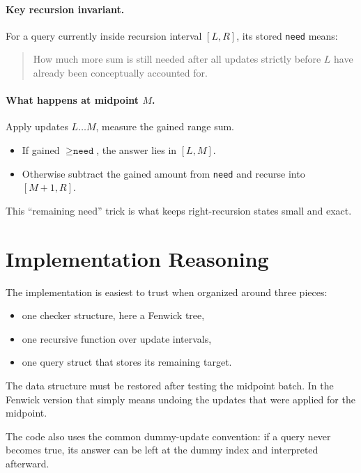 \paragraph{Key recursion invariant.}
For a query currently inside recursion interval \([L,R]\), its stored \texttt{need} means:

\begin{quote}
How much more sum is still needed after all updates strictly before \(L\) have already been conceptually accounted for.
\end{quote}

\paragraph{What happens at midpoint \(M\).}
Apply updates \(L \dots M\), measure the gained range sum.

\begin{itemize}
  \item If gained \(\ge \texttt{need}\), the answer lies in \([L,M]\).
  \item Otherwise subtract the gained amount from \texttt{need} and recurse into \([M+1,R]\).
\end{itemize}

This ``remaining need'' trick is what keeps right-recursion states small and exact.

\section*{Implementation Reasoning}

The implementation is easiest to trust when organized around three pieces:

\begin{itemize}
  \item one checker structure, here a Fenwick tree,
  \item one recursive function over update intervals,
  \item one query struct that stores its remaining target.
\end{itemize}

The data structure must be restored after testing the midpoint batch. In the Fenwick version that simply means undoing
the updates that were applied for the midpoint.

The code also uses the common dummy-update convention: if a query never becomes true, its answer can be left at the
dummy index and interpreted afterward.

